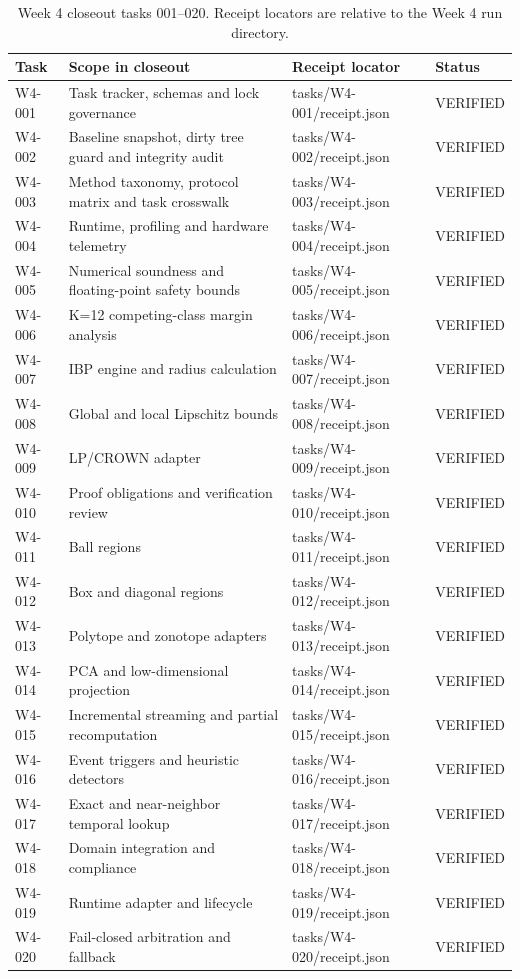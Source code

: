 \begin{table}[H]
\caption{Week 4 closeout tasks 001--020. Receipt locators are relative to the Week 4 run directory.}
\centering\small
\begin{tabularx}{\textwidth}{@{}lYYl@{}}\toprule
Task & Scope in closeout & Receipt locator & Status\\
\midrule
W4-001 & Task tracker, schemas and lock governance & tasks/W4-001/receipt.json & VERIFIED\\
W4-002 & Baseline snapshot, dirty tree guard and integrity audit & tasks/W4-002/receipt.json & VERIFIED\\
W4-003 & Method taxonomy, protocol matrix and task crosswalk & tasks/W4-003/receipt.json & VERIFIED\\
W4-004 & Runtime, profiling and hardware telemetry & tasks/W4-004/receipt.json & VERIFIED\\
W4-005 & Numerical soundness and floating-point safety bounds & tasks/W4-005/receipt.json & VERIFIED\\
W4-006 & K=12 competing-class margin analysis & tasks/W4-006/receipt.json & VERIFIED\\
W4-007 & IBP engine and radius calculation & tasks/W4-007/receipt.json & VERIFIED\\
W4-008 & Global and local Lipschitz bounds & tasks/W4-008/receipt.json & VERIFIED\\
W4-009 & LP/CROWN adapter & tasks/W4-009/receipt.json & VERIFIED\\
W4-010 & Proof obligations and verification review & tasks/W4-010/receipt.json & VERIFIED\\
W4-011 & Ball regions & tasks/W4-011/receipt.json & VERIFIED\\
W4-012 & Box and diagonal regions & tasks/W4-012/receipt.json & VERIFIED\\
W4-013 & Polytope and zonotope adapters & tasks/W4-013/receipt.json & VERIFIED\\
W4-014 & PCA and low-dimensional projection & tasks/W4-014/receipt.json & VERIFIED\\
W4-015 & Incremental streaming and partial recomputation & tasks/W4-015/receipt.json & VERIFIED\\
W4-016 & Event triggers and heuristic detectors & tasks/W4-016/receipt.json & VERIFIED\\
W4-017 & Exact and near-neighbor temporal lookup & tasks/W4-017/receipt.json & VERIFIED\\
W4-018 & Domain integration and compliance & tasks/W4-018/receipt.json & VERIFIED\\
W4-019 & Runtime adapter and lifecycle & tasks/W4-019/receipt.json & VERIFIED\\
W4-020 & Fail-closed arbitration and fallback & tasks/W4-020/receipt.json & VERIFIED\\
\bottomrule\end{tabularx}
\end{table}
